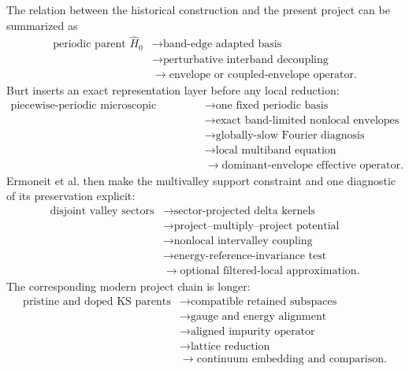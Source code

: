 The relation between the historical construction and the present project can
be summarized as
\begin{equation}
  \begin{aligned}
  \text{periodic parent }\hat H_0
  &\longrightarrow
  \text{band-edge adapted basis}\\
  &\longrightarrow
  \text{perturbative interband decoupling}\\
  &\longrightarrow
  \text{envelope or coupled-envelope operator}.
  \end{aligned}
  \label{eq:lk-reduction-chain}
\end{equation}
Burt inserts an exact representation layer before any local reduction:
\begin{equation}
  \begin{aligned}
  \text{piecewise-periodic microscopic operator}
  &\longrightarrow
  \text{one fixed periodic basis}\\
  &\longrightarrow
  \text{exact band-limited nonlocal envelopes}\\
  &\longrightarrow
  \text{globally-slow Fourier diagnosis}\\
  &\longrightarrow
  \text{local multiband equation}\\
  &\longrightarrow
  \text{dominant-envelope effective operator}.
  \end{aligned}
  \label{eq:burt-reduction-chain}
\end{equation}
Ermoneit et al. then make the multivalley support constraint and one diagnostic
of its preservation explicit:
\begin{equation}
  \begin{aligned}
  \text{disjoint valley sectors}
  &\longrightarrow
  \text{sector-projected delta kernels}\\
  &\longrightarrow
  \text{project--multiply--project potential}\\
  &\longrightarrow
  \text{nonlocal intervalley coupling}\\
  &\longrightarrow
  \text{energy-reference-invariance test}\\
  &\longrightarrow
  \text{optional filtered-local approximation}.
  \end{aligned}
  \label{eq:ermoneit-reduction-chain}
\end{equation}
The corresponding modern project chain is longer:
\begin{equation}
  \begin{aligned}
  \text{pristine and doped KS parents}
  &\longrightarrow
  \text{compatible retained subspaces}\\
  &\longrightarrow
  \text{gauge and energy alignment}\\
  &\longrightarrow
  \text{aligned impurity operator}\\
  &\longrightarrow
  \text{lattice reduction}\\
  &\longrightarrow
  \text{continuum embedding and comparison}.
  \end{aligned}
  \label{eq:project-reduction-chain-lk}
\end{equation}

